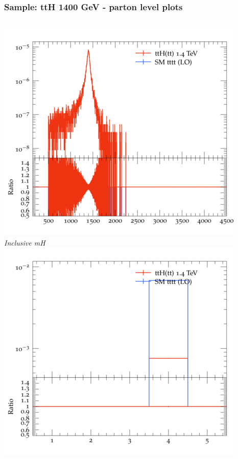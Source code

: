 \documentclass{beamer}
\begin{document}
\begin{frame}
\frametitle{Sample: ttH 1400 GeV - parton level plots}
\begin{columns}
\includegraphics[width=\textwidth]{../plots/ttH_1400/tttt_ttH/Inclusive_mH.png}\\
\textit{\small Inclusive mH}
\includegraphics[width=\textwidth]{../plots/ttH_1400/tttt_ttH/Inclusive_nTop.png}\\

\end{columns}
\end{frame}
\end{document}
